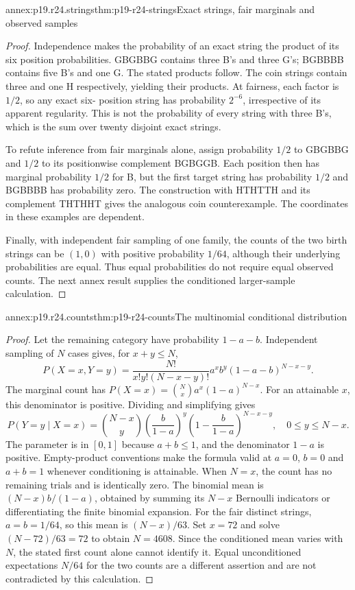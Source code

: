 \begin{annexitem}{annex:p19.r24.strings}{thm:p19-r24-strings}{Exact strings, fair marginals and observed samples}
\begin{proof}
Independence makes the probability of an exact string the product of
its six position probabilities. GBGBBG contains three B's and three
G's; BGBBBB contains five B's and one G. The stated products follow.
The coin strings contain three and one H respectively, yielding their
products. At fairness, each factor is \(1/2\), so any exact six-
position string has probability \(2^{-6}\), irrespective of its
apparent regularity. This is not the probability of every string with
three B's, which is the sum over twenty disjoint exact strings.

To refute inference from fair marginals alone, assign probability
\(1/2\) to GBGBBG and \(1/2\) to its positionwise complement
BGBGGB. Each position then has marginal probability \(1/2\) for
B, but the first target string has probability \(1/2\) and
BGBBBB has probability zero. The construction with HTHTTH and its
complement THTHHT gives the analogous coin counterexample. The
coordinates in these examples are dependent.

Finally, with independent fair sampling of one family, the counts
of the two birth strings can be \((1,0)\) with positive probability
\(1/64\), although their underlying probabilities are equal. Thus
equal probabilities do not require equal observed counts. The next
annex result supplies the conditioned larger-sample calculation.
\end{proof}
\end{annexitem}

\begin{annexitem}{annex:p19.r24.counts}{thm:p19-r24-counts}{The multinomial conditional distribution}
\begin{proof}
Let the remaining category have probability \(1-a-b\).
Independent sampling of \(N\) cases gives, for \(x+y\leq N\),
\[
 P(X=x,Y=y)=\frac{N!}{x!y!(N-x-y)!}
       a^x b^y(1-a-b)^{N-x-y}.
\]
The marginal count has
\(P(X=x)=\binom Nx a^x(1-a)^{N-x}\).
For an attainable \(x\), this denominator is positive. Dividing
and simplifying gives
\[
 P(Y=y\mid X=x)=\binom{N-x}{y}
 \left(\frac{b}{1-a}\right)^y
 \left(1-\frac{b}{1-a}\right)^{N-x-y},
       \quad 0\leq y\leq N-x.
\]
The parameter is in \([0,1]\) because \(a+b\leq1\), and
the denominator \(1-a\) is positive. Empty-product conventions
make the formula valid at \(a=0\), \(b=0\) and
\(a+b=1\) whenever conditioning is attainable. When \(N=x\),
the count has no remaining trials and is identically zero.
The binomial mean is \((N-x)b/(1-a)\), obtained by summing its
\(N-x\) Bernoulli indicators or differentiating the finite binomial
expansion. For the fair distinct strings, \(a=b=1/64\), so this
mean is \((N-x)/63\). Set \(x=72\) and solve
\((N-72)/63=72\) to obtain \(N=4608\). Since the conditioned
mean varies with \(N\), the stated first count alone cannot identify
it. Equal unconditioned expectations \(N/64\) for the two counts
are a different assertion and are not contradicted by this calculation.
\end{proof}
\end{annexitem}
